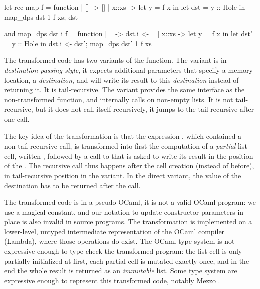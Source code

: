 \hspace{-1.6em}
\begin{minipage}{0.5\linewidth}
\begin{Ocaml}
let rec map f = function
| [] -> []
| x::xs ->
  let y = f x in
  let dst = y :: Hole in
  map_dps dst 1 f xs;
  dst
\end{Ocaml}
\end{minipage}
\hfill
\begin{minipage}{0.5\linewidth}
\begin{Ocaml}
and map_dps dst i f = function
| [] ->
  dst.i <- []
| x::xs ->
  let y = f x in
  let dst' = y :: Hole in
  dst.i <- dst';
  map_dps dst' 1 f xs
\end{Ocaml}
\end{minipage}

The transformed code has two variants of the  function. The
 variant is in \emph{destination-passing style}, it
expects additional parameters that specify a memory location,
a \emph{destination}, and will write its result to this
\emph{destination} instead of returning it. It is tail-recursive. The
 variant provides the same interface as the non-transformed
function, and internally calls  on non-empty lists. It
is not tail-recursive, but it does not call itself recursively, it
jumps to the tail-recursive  after one call.

The key idea of the transformation is that the expression , which contained a non-tail-recursive call, is transformed into first the computation of a \emph{partial} list cell, written , followed by a call to  that is asked
to write its result in the position of the . The recursive
call thus happens after the cell creation (instead of before), in
tail-recursive position in the  variant. In the direct
variant, the value of the destination  has to be returned
after the call.

The transformed code is in a pseudo-OCaml, it is not a valid OCaml
program: we use a magical  constant, and our notation
 to update constructor parameters in-place is also
invalid in source programs. The transformation is implemented on
a lower-level, untyped intermediate representation of the OCaml
compiler (Lambda), where those operations do exist. The OCaml type
system is not expressive enough to type-check the transformed program:
the list cell is only partially-initialized at first, each partial
cell is mutated exactly once, and in the end the whole result is
returned as an \emph{immutable} list. Some type system are expressive
enough to represent this transformed code, notably Mezzo
\citep*{mezzo}.


